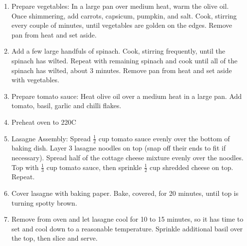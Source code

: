 \documentclass[11pt,a4paper]{article}
\begin{document}
\begin{enumerate}
  \item Prepare vegetables: In a large pan over medium heat, warm the olive oil. Once shimmering, add carrots, capsicum, pumpkin, and salt. Cook, stirring every couple of minutes, until vegetables are golden on the edges. Remove pan from heat and set aside.
  \item Add a few large handfuls of spinach. Cook, stirring frequently, until the spinach has wilted. Repeat with remaining spinach and cook until all of the spinach has wilted, about 3 minutes. Remove pan from heat and set aside with vegetables.
  \item Prepare tomato sauce: Heat olive oil over a medium heat in a large pan. Add tomato, basil, garlic and chilli flakes.
  \item Preheat oven to 220\textdegree C
  \item Lasagne Assembly: Spread $ \frac {1} {2} $ cup tomato sauce evenly over the bottom of baking dish. Layer 3 lasagne noodles on top (snap off their ends to fit if necessary). Spread half of the cottage cheese mixture evenly over the noodles. Top with $ \frac {1} {3} $ cup tomato sauce, then sprinkle $\frac {1} {2} $ cup shredded cheese on top. Repeat.
  \item Cover lasagne with baking paper. Bake, covered, for 20 minutes, until top is turning spotty brown.
  \item Remove from oven and let lasagne cool for 10 to 15 minutes, so it has time to set and cool down to a reasonable temperature. Sprinkle additional basil over the top, then slice and serve.
\end{enumerate}
\end{document}
